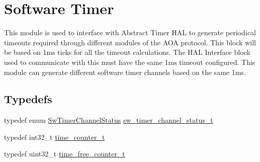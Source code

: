\hypertarget{group__sw__timer}{}\section{Software Timer}
\label{group__sw__timer}


This module is used to interface with Abstract Timer H\+AL to generate periodical timeouts required through different modules of the A\+OA protocol. This block will be based on 1ms ticks for all the timeout calculations. The H\+AL Interface block used to communicate with this must have the same 1ms timeout configured. This module can generate different software timer channels based on the same 1ms.  


\subsection*{Typedefs}
\begin{DoxyCompactItemize}
\item 
typedef enum \hyperlink{group__sw__timer_ga44b572e8abe4da32037ad911b133f0be}{Sw\+Timer\+Channel\+Status} \hyperlink{group__sw__timer_ga11c8ba265a273d5d3dda5e269163d3e7}{sw\+\_\+timer\+\_\+channel\+\_\+status\+\_\+t}
\item 
typedef int32\+\_\+t \hyperlink{group__sw__timer_ga85b49889ff28c6bc6a5368a08b0f9650}{time\+\_\+counter\+\_\+t}
\item 
typedef uint32\+\_\+t \hyperlink{group__sw__timer_gaf131d055058588461e646ccea72592bc}{time\+\_\+free\+\_\+counter\+\_\+t}
\end{DoxyCompactItemize}
